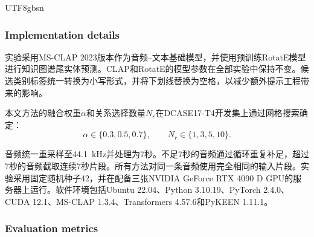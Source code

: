 \begin{CJK*}{UTF8}{gbsn}
\subsubsection{Implementation details}\label{sec:implementation-details}

实验采用MS-CLAP 2023版本作为音频--文本基础模型，并使用预训练RotatE模型进行知识图谱尾实体预测。CLAP和RotatE的模型参数在全部实验中保持不变。候选类别标签统一转换为小写形式，并将下划线替换为空格，以减少额外提示工程带来的影响。




本文方法的融合权重$\alpha$和关系选择数量$N_r$在DCASE17-T4开发集上通过网格搜索确定：
\begin{equation}
\alpha\in\{0.3,0.5,0.7\},\qquad
N_r\in\{1,3,5,10\}.
\end{equation}

音频统一重采样至44.1~kHz并处理为7秒。不足7秒的音频通过循环重复补足，超过7秒的音频截取连续7秒片段。所有方法对同一条音频使用完全相同的输入片段。实验采用固定随机种子42，并在配备三张NVIDIA GeForce RTX 4090 D GPU的服务器上运行。软件环境包括Ubuntu 22.04、Python 3.10.19、PyTorch 2.4.0、CUDA 12.1、MS-CLAP 1.3.4、Transformers 4.57.6和PyKEEN 1.11.1。

\subsubsection{Evaluation metrics}\label{sec:evaluation-metrics}


\end{CJK*}
